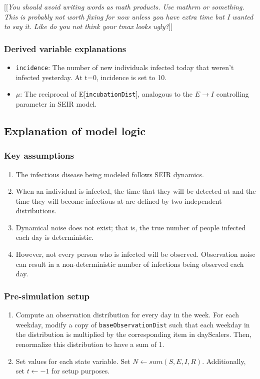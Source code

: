 \documentclass{article}
\newcommand{\code}[1]{\texttt{#1}}
\newcommand{\jd}[1]{[[\textsl{#1}]]}
\begin{document}
\jd{You should avoid writing words as math products. Use mathrm or something. This is probably not worth fixing for now unless you have extra time but I wanted to say it. Like do you \emph{not} think your tmax looks ugly?}

\subsubsection{Derived variable explanations}
\begin{itemize}
    \item \code{incidence}: The number of new individuals infected today that weren't infected yesterday. At t=0, incidence is set to 10.
    \item $\mu$: The reciprocal of E[\code{incubationDist}], analogous to the $E \rightarrow I$ controlling parameter in SEIR model.
\end{itemize}

\subsection{Explanation of model logic}

\subsubsection{Key assumptions}

\begin{enumerate}
	\item The infectious disease being modeled follows SEIR dynamics.
	\item When an individual is infected, the time that they will be detected at and the time they will become infectious at are defined by two independent distributions.
	\item Dynamical noise does not exist; that is, the true number of people infected each day is deterministic.  
	\item However, not every person who is infected will be observed. Observation noise can result in a non-deterministic number of infections being observed each day. 

\end{enumerate}

\subsubsection{Pre-simulation setup}

\begin{enumerate}
    \item Compute an observation distribution for every day in the week. For each weekday, modify a copy of \code{baseObservationDist} such that each weekday in the distribution is multiplied by the corresponding item in dayScalers. Then, renormalize this distribution to have a sum of 1.
    
    \item Set values for each state variable. Set $N \gets sum(S, E, I, R)$. Additionally, set $t \gets -1$ for setup purposes.

\end{enumerate}
\end{document}
